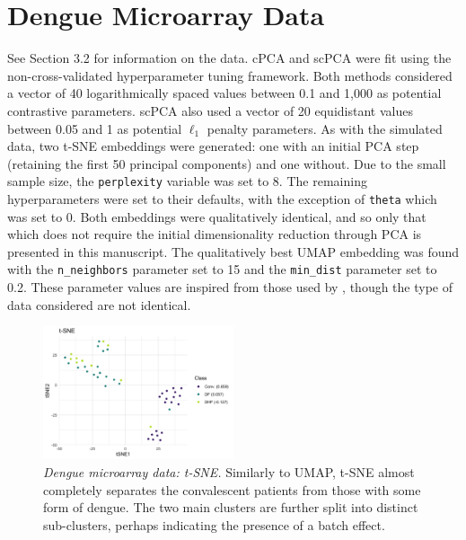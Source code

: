 \documentclass{article}
\begin{document}
\FloatBarrier

\section{Dengue Microarray Data}\label{sup_dengue}

See Section 3.2 %
for information on the data. cPCA and scPCA were fit using the non-cross-validated hyperparameter tuning framework. Both methods considered a vector of 40 logarithmically spaced values between 0.1 and 1,000 as potential contrastive parameters. scPCA also used a vector of 20 equidistant values between 0.05 and 1 as potential $\ell_1$ penalty parameters. As with the simulated data, two t-SNE embeddings were generated: one with an initial PCA step (retaining the first 50 principal components) and one without. Due to the small sample size, the \texttt{perplexity} variable was set to 8. The remaining hyperparameters were set to their defaults, with the exception of \texttt{theta} which was set to 0. Both embeddings were qualitatively identical, and so only that which does not require the initial dimensionality reduction through PCA is presented in this manuscript. The qualitatively best UMAP embedding was found with the \texttt{n\_neighbors} parameter set to 15 and the \texttt{min\_dist} parameter set to 0.2. These parameter values are inspired from those used by \citet{Becht2019}, though the type of data considered are not identical.

\begin{figure}[!htbp]
    \centering
    \includegraphics[width=0.5\textwidth]{figures/dengue_tsne}
    \caption{
    {\em Dengue microarray data: t-SNE.}
    Similarly to UMAP, t-SNE almost completely separates the convalescent patients from those with some form of dengue. The two main clusters are further split into distinct sub-clusters, perhaps indicating the presence of a batch effect. 
    }
    \label{fig:dengue_tsne}
\end{figure}
\end{document}
